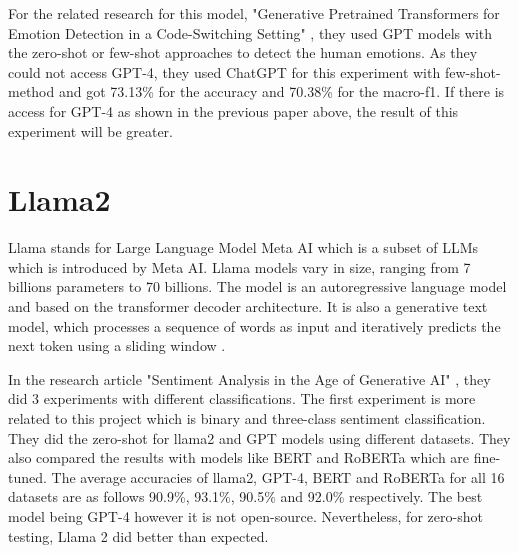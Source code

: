  For the related research for this model, "Generative Pretrained Transformers for Emotion Detection in a Code-Switching Setting" \cite{Nedilko}, they used GPT models with the zero-shot or few-shot approaches to detect the human emotions. As they could not access GPT-4, they used ChatGPT for this experiment with few-shot-method and got 73.13\% for the accuracy and 70.38\% for the macro-f1. If there is access for GPT-4 as shown in the previous paper above, the result of this experiment will be greater.

 \section{Llama2}
Llama stands for Large Language Model Meta AI which is a subset of LLMs which is introduced by Meta AI. Llama models vary in size, ranging from 7 billions parameters to 70 billions. The model is an autoregressive language model and based on the transformer decoder architecture. It is also a generative text model, which processes a sequence of words as input and iteratively predicts the next token using a sliding window \cite{Iraqi_2023}.

In the research article "Sentiment Analysis in the Age of Generative AI" \cite{Krugmann_Hartmann_2024}, they did 3 experiments with different classifications. The first experiment is more related to this project which is binary and three-class sentiment classification. They did the zero-shot for llama2 and GPT models using different datasets. They also compared the results with models like BERT and RoBERTa which are fine-tuned. The average accuracies of llama2, GPT-4, BERT and RoBERTa for all 16 datasets are as follows 90.9\%, 93.1\%, 90.5\% and 92.0\% respectively. The best model being GPT-4 however it is not open-source. Nevertheless, for zero-shot testing, Llama 2 did better than expected.

